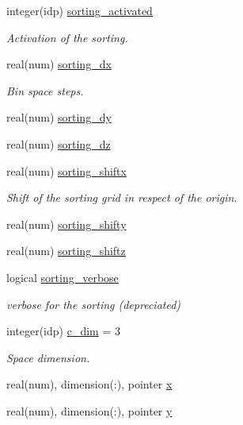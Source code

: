 \begin{DoxyCompactItemize}
integer(idp) \hyperlink{namespaceshared__data_aa7be2be1e809cb95538e562e604c4f1e}{sorting\+\_\+activated}
\begin{DoxyCompactList}\small\item\em Activation of the sorting. \end{DoxyCompactList}\item 
real(num) \hyperlink{namespaceshared__data_a3f406bc80cf450b11767a651d0ea651c}{sorting\+\_\+dx}
\begin{DoxyCompactList}\small\item\em Bin space steps. \end{DoxyCompactList}\item 
real(num) \hyperlink{namespaceshared__data_a4fd74c6832df0957cd1b786cf2cc6810}{sorting\+\_\+dy}
\item 
real(num) \hyperlink{namespaceshared__data_aa30e6dbb24284ab1c4dae4ba5e219eb4}{sorting\+\_\+dz}
\item 
real(num) \hyperlink{namespaceshared__data_a7809127b7e85af886b2fd72b3bbdd065}{sorting\+\_\+shiftx}
\begin{DoxyCompactList}\small\item\em Shift of the sorting grid in respect of the origin. \end{DoxyCompactList}\item 
real(num) \hyperlink{namespaceshared__data_a0f7304391a34d6a0216cab82d97ee037}{sorting\+\_\+shifty}
\item 
real(num) \hyperlink{namespaceshared__data_a6b24bb129ab0581a9b353bd1cb663422}{sorting\+\_\+shiftz}
\item 
logical \hyperlink{namespaceshared__data_a1e3cea0f116b338483676d0bd5126c75}{sorting\+\_\+verbose}
\begin{DoxyCompactList}\small\item\em verbose for the sorting (depreciated) \end{DoxyCompactList}\item 
integer(idp) \hyperlink{namespaceshared__data_a9dcd30bdab987f8957482cbd80ba40b3}{c\+\_\+dim} = 3
\begin{DoxyCompactList}\small\item\em Space dimension. \end{DoxyCompactList}\item 
real(num), dimension(\+:), pointer \hyperlink{namespaceshared__data_a5a1b9ce71c6bcfbe478783cc7a5e4d7d}{x}
\item 
real(num), dimension(\+:), pointer \hyperlink{namespaceshared__data_acdc008c8a2a09f5f45b09e3f93aa04cf}{y}

\end{DoxyCompactItemize}

